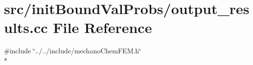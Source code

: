 \section{src/init\-Bound\-Val\-Probs/output\-\_\-results.cc File Reference}
\label{output__results_8cc}
{\ttfamily \#include \char`\"{}../../include/mechano\-Chem\-F\-E\-M.\-h\char`\"{}}\\*
